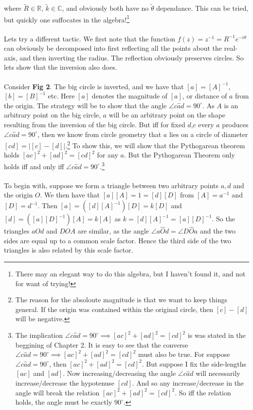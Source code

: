 where $\tilde{R}\in\mathbb{R}$, $\tilde{k}\in\mathbb{C}$, and obviously both have no $\tilde{\theta}$ dependance. This can be tried, but quickly one suffocates in the algebra!\footnote{There may an elegant way to do this algebra, but I haven't found it, and not for want of trying!}\\ \\
Lets try a different tactic. We first note that the function $f(z)=z^{-1}=R^{-1}e^{-i\theta}$ can obviously be decomposed into first reflecting all the points about the real-axis, and then inverting the radius. The reflection obviously preserves circles. So lets show that the inversion also does. \\ \\
Consider \textbf{Fig 2}. The big circle is inverted, and we have that $[a]=[A]^{-1}$, $[b]=[B]^{-1}$ etc. Here $[a]$ denotes the magnitude of $[a]$, or distance of $a$ from the origin. The strategy will be to show that the angle $\angle c\hat{a} d=90^{\circ}$. As $A$ is an arbitrary point on the big circle, $a$ will be an arbitrary point on the shape resulting from the inversion of the big circle. But iff for fixed $d$,$c$ every $a$ produces $\angle c\hat{a} d=90^{\circ}$, then we know from circle geometry that $a$ lies on a circle of diameter $[cd]=|[c]-[d]|$.\footnote{The reason for the absoloute magnitude is that we want to keep things general. If the origin was contained within the original circle, then $[c]-[d]$ will be negative.} To show this, we will show that the Pythogarean theorem holds $[ac]^2+[ad]^2=[cd]^2$ for any $a$. But the Pythogarean Theorem only holds iff and only iff $\angle c\hat{a} d=90^{\circ}$.\footnote{The implication $\angle c\hat{a} d=90^{\circ}\implies [ac]^2+[ad]^2=[cd]^2$ is was stated in the beggining of Chapter 2. It is easy to see that the converse $\angle c\hat{a} d=90^{\circ}\implies [ac]^2+[ad]^2=[cd]^2$ must also be true. For suppose $\angle c\hat{a} d=90^\circ$, then $[ac]^2+[ad]^2=[cd]^2$. But suppose I fix the side-lengths $[ac]$ and $[ad]$. Now increasing/decreasing the angle $\angle c\hat{a} d$ will necessarily increase/decrease the hypotenuse $[cd]$. And so any increase/decrease in the angle will break the relation $[ac]^2+[ad]^2=[cd]^2$. So iff the relation holds, the angle must be exactly $90^\circ$.   }   \\ \\
To begin with, suppose we form a triangle between two arbitrary points $a,d$ and the origin $O$. We then have that $[a][A]=1=[d][D]$ from $[A]=a^{-1}$ and $[D]=d^{-1}$.  Then $[a]=([d][A]^{-1})[D]=k [D]$ and $[d]=([a][D]^{-1})[A]=k [A]$ as $k=[d][A]^{-1}=[a][D]^{-1}$. So the triangles $aOd$ and $DOA$ are similar, as the angle $\angle a\hat{O}d=\angle D\hat{O}a$ and the two sides are equal up to a common scale factor. Hence the third side of the two triangles is also related by this scale factor. 
